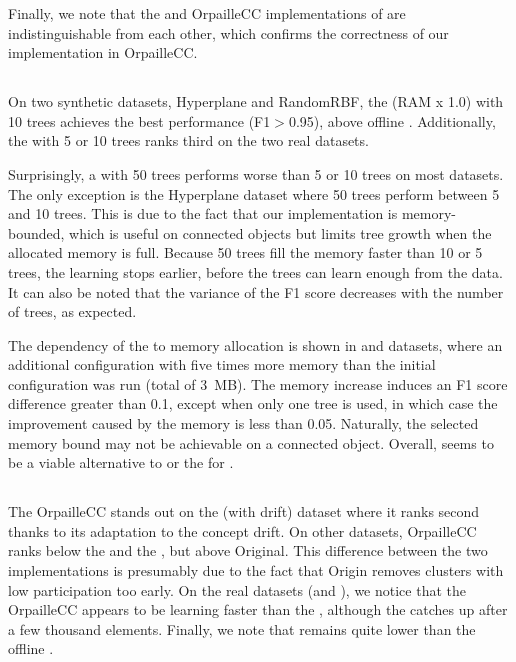 Finally, we note that the \streamdmcpp and OrpailleCC implementations of
\naivebayes are indistinguishable from each other, which confirms the correctness of our
implementation in OrpailleCC.

\subsection{\mondrianforest}

On two synthetic datasets, Hyperplane and RandomRBF, the \mondrianforest (RAM x
1.0) with 10 trees achieves the best performance (F1$>$0.95), above offline
\knn.  Additionally, the \mondrianforest with 5 or 10 trees ranks third on the
two real datasets. 

Surprisingly, a \mondrianforest with 50 trees performs worse than 5 or 10
trees on most datasets. The only exception is the Hyperplane dataset where
50 trees perform between 5 and 10 trees. This is due to the fact that
our \mondrianforest implementation is memory-bounded, which is
useful on connected objects but limits tree growth when the allocated memory is
full. Because 50 trees fill the memory faster than 10 or 5 trees, the
learning stops earlier, before the trees can learn enough from the
data. It can also be noted that the variance of the F1 score decreases with
the number of trees, as expected.

The dependency of the \mondrianforest to memory allocation is shown in
\banosdataset and \recofitdataset datasets, where an additional
configuration with five times more memory than the initial configuration was run
 (total of 3~MB).  The memory increase induces an F1 score difference
greater than 0.1, except when only one tree is used, in
which case the improvement caused by the memory is less than 0.05. Naturally, the
selected memory bound may not be achievable on a connected object. Overall,
\mondrianforest seems to be a viable alternative to \naivebayes or the
\hoeffdingtree for \har.


\subsection{\mcnn}

The \mcnn OrpailleCC stands out on the \banosdataset (with drift) dataset where it
ranks second thanks to its adaptation to the concept drift.  On other datasets,
\mcnn OrpailleCC ranks below the \mondrianforest and the \hoeffdingtree, but
above \mcnn Original. This difference between the two \mcnn implementations is presumably due
to the fact that \mcnn Origin removes clusters with low participation too early.
On the real datasets (\banosdataset and \recofitdataset), we notice that the
\mcnn OrpailleCC appears to be learning faster than the \mondrianforest,
although the \mondrianforest catches up after a few thousand elements. Finally,
we note that \mcnn remains quite lower than the offline \knn.

